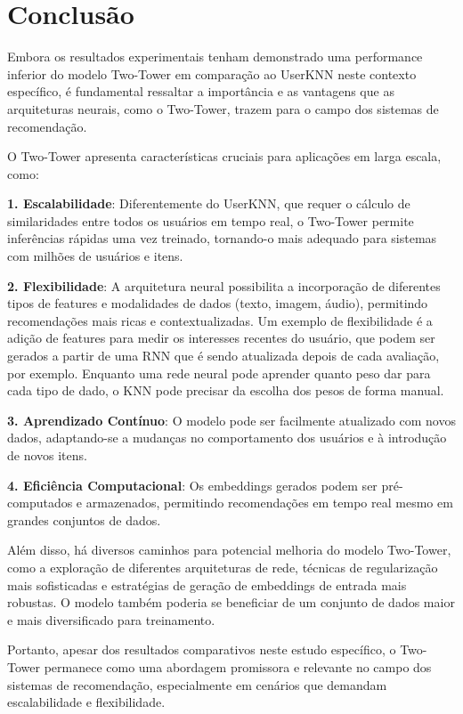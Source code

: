 \documentclass[sigconf]{acmart}
\begin{document}
\section{Conclusão}

Embora os resultados experimentais tenham demonstrado uma performance inferior do modelo Two-Tower em comparação ao UserKNN neste contexto específico, é fundamental ressaltar a importância e as vantagens que as arquiteturas neurais, como o Two-Tower, trazem para o campo dos sistemas de recomendação.

O Two-Tower apresenta características cruciais para aplicações em larga escala, como:

\textbf{1. Escalabilidade}: Diferentemente do UserKNN, que requer o cálculo de similaridades entre todos os usuários em tempo real, o Two-Tower permite inferências rápidas uma vez treinado, tornando-o mais adequado para sistemas com milhões de usuários e itens.

\textbf{2. Flexibilidade}: A arquitetura neural possibilita a incorporação de diferentes tipos de features e modalidades de dados (texto, imagem, áudio), permitindo recomendações mais ricas e contextualizadas. Um exemplo de flexibilidade é a adição de features para medir os interesses recentes do usuário, que podem ser gerados a partir de uma RNN que é sendo atualizada depois de cada avaliação, por exemplo. Enquanto uma rede neural pode aprender quanto peso dar para cada tipo de dado, o KNN pode precisar da escolha dos pesos de forma manual.

\textbf{3. Aprendizado Contínuo}: O modelo pode ser facilmente atualizado com novos dados, adaptando-se a mudanças no comportamento dos usuários e à introdução de novos itens.

\textbf{4. Eficiência Computacional}: Os embeddings gerados podem ser pré-computados e armazenados, permitindo recomendações em tempo real mesmo em grandes conjuntos de dados.

Além disso, há diversos caminhos para potencial melhoria do modelo Two-Tower, como a exploração de diferentes arquiteturas de rede, técnicas de regularização mais sofisticadas e estratégias de geração de embeddings de entrada mais robustas. O modelo também poderia se beneficiar de um conjunto de dados maior e mais diversificado para treinamento.

Portanto, apesar dos resultados comparativos neste estudo específico, o Two-Tower permanece como uma abordagem promissora e relevante no campo dos sistemas de recomendação, especialmente em cenários que demandam escalabilidade e flexibilidade.
\end{document}
